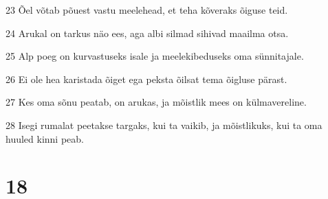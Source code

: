 \par 23 Õel võtab põuest vastu meelehead, et teha kõveraks õiguse teid.
\par 24 Arukal on tarkus näo ees, aga albi silmad sihivad maailma otsa.
\par 25 Alp poeg on kurvastuseks isale ja meelekibeduseks oma sünnitajale.
\par 26 Ei ole hea karistada õiget ega peksta õilsat tema õigluse pärast.
\par 27 Kes oma sõnu peatab, on arukas, ja mõistlik mees on külmavereline.
\par 28 Isegi rumalat peetakse targaks, kui ta vaikib, ja mõistlikuks, kui ta oma huuled kinni peab.

\chapter{18}

